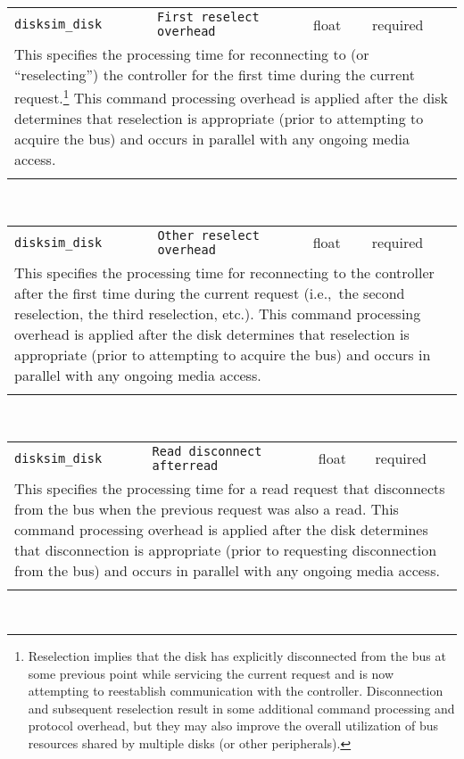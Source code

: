 \noindent 
\begin{tabular}{|p{1.5in}|p{3.5in}|p{0.5in}|p{0.5in}|}
\cline{1-4}
\texttt{disksim\_disk} & \texttt{First reselect overhead} & float & required \\ 
\cline{1-4}
\multicolumn{4}{|p{6in}|}{
This specifies the processing time for reconnecting to (or
``reselecting'') the controller for the first time during the current
request.\footnote{Reselection implies that the disk has explicitly
disconnected from the bus at some previous point while servicing the
current request and is now attempting to reestablish communication
with the controller. Disconnection and subsequent reselection result
in some additional command processing and protocol overhead, but they
may also improve the overall utilization of bus resources shared by
multiple disks (or other peripherals).} This command processing
overhead is applied after the disk determines that reselection is
appropriate (prior to attempting to acquire the bus) and occurs in
parallel with any ongoing media access.
}\\ 
\cline{1-4}
\multicolumn{4}{p{5in}}{}\\
\end{tabular}\\ 
\noindent 
\begin{tabular}{|p{1.5in}|p{3.5in}|p{0.5in}|p{0.5in}|}
\cline{1-4}
\texttt{disksim\_disk} & \texttt{Other reselect overhead} & float & required \\ 
\cline{1-4}
\multicolumn{4}{|p{6in}|}{
This specifies the processing time for reconnecting to the controller
after the first time during the current request (i.e.,~the second
reselection, the third reselection, etc.). This command processing
overhead is applied after the disk determines that reselection is
appropriate (prior to attempting to acquire the bus) and occurs in
parallel with any ongoing media access.
}\\ 
\cline{1-4}
\multicolumn{4}{p{5in}}{}\\
\end{tabular}\\ 
\noindent 
\begin{tabular}{|p{1.5in}|p{3.5in}|p{0.5in}|p{0.5in}|}
\cline{1-4}
\texttt{disksim\_disk} & \texttt{Read disconnect afterread} & float & required \\ 
\cline{1-4}
\multicolumn{4}{|p{6in}|}{
This specifies the processing time for a read request that disconnects
from the bus when the previous request was also a read. This command
processing overhead is applied after the disk determines that
disconnection is appropriate (prior to requesting disconnection from
the bus) and occurs in parallel with any ongoing media access.
}\\ 
\cline{1-4}
\multicolumn{4}{p{5in}}{}\\
\end{tabular}\\ 
